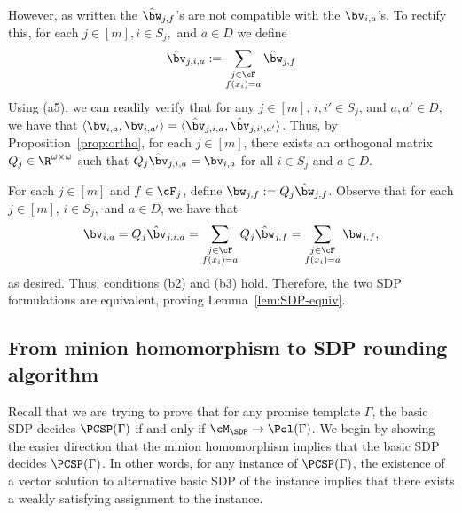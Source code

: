 However, as written the ${\hat{\bw}_{j,f}}$'s are not compatible with the ${\bv_{i,a}}$'s. {To rectify this, for each $j \in [m], i \in S_j,$ and $a \in D$ we define}
\[{\hat{\bv}_{j,i,a}} := \sum_{\substack{{j \in \cF}\\{f(x_i)} = a}} {\hat{\bw}_{j,f}}\]
{Using (a5), we can readily verify that for any $j \in [m]$, $i,i' \in S_j$, and $a,a' \in D$, we have that $\langle \bv_{i,a}, \bv_{i,a'}\rangle = \langle \hat{\bv}_{j,i,a}, \hat{\bv}_{j,i',a'}\rangle$. Thus, by Proposition~\ref{prop:ortho}, for each $j \in [m]$, there exists an orthogonal matrix $Q_j \in \R^{\omega \times \omega}$ such that $Q_j \hat{\bv}_{j,i,a} = \bv_{i,a}$ for all $i \in S_j$ and $a \in D$.}

{For each $j \in [m]$ and $f \in \cF_j$, define $\bw_{j,f} := Q_j \hat{\bw}_{j,f}$. Observe that for each $j \in [m]$, $i \in S_j,$ and $a \in D$, we have that
\[
    \bv_{i,a} = Q_j \hat{\bv}_{j,i,a} = \sum_{\substack{{j \in \cF}\\{f(x_i)} = a}} Q_j {\hat{\bw}_{j,f}} = \sum_{\substack{{j \in \cF}\\{f(x_i)} = a}} \bw_{j,f}, 
\]}
as desired. Thus, conditions (b2) and (b3) hold. {Therefore,} the two SDP formulations are equivalent{, proving Lemma~\ref{lem:SDP-equiv}.}

\subsection{From minion homomorphism to SDP rounding algorithm}

Recall that we are trying to prove that {for any promise template $\Gamma$,} the basic SDP decides $\PCSP({\Gamma}) $ if and only if $\cM_{\SDP} \to \Pol({\Gamma})$.  We begin by showing the {easier} direction that the minion homomorphism implies that the basic SDP decides $\PCSP({\Gamma})$. {In other words, for any instance of $\PCSP(\Gamma)$, the existence of a vector solution to alternative basic SDP of the instance implies that there exists a weakly satisfying assignment to the instance.}

